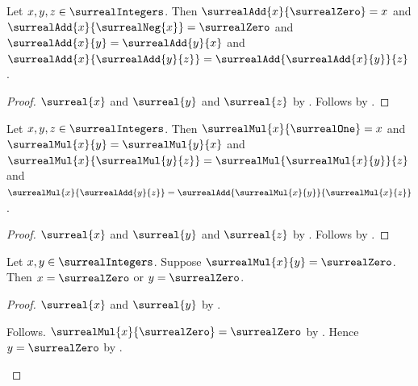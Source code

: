 \begin{theorem}\label{surreal_integer_additive_laws}
    Let $x,y,z\in\surrealIntegers$.
    Then
        $\surrealAdd{x}{\surrealZero}=x$ and
        $\surrealAdd{x}{\surrealNeg{x}}=\surrealZero$ and
        $\surrealAdd{x}{y}=\surrealAdd{y}{x}$ and
        $\surrealAdd{x}{\surrealAdd{y}{z}}
            =\surrealAdd{\surrealAdd{x}{y}}{z}$.
\end{theorem}
\begin{proof}
    $\surreal{x}$ and $\surreal{y}$ and $\surreal{z}$
        by .
    Follows by
        .
\end{proof}

\begin{theorem}\label{surreal_integer_multiplicative_laws}
    Let $x,y,z\in\surrealIntegers$.
    Then
        $\surrealMul{x}{\surrealOne}=x$ and
        $\surrealMul{x}{y}=\surrealMul{y}{x}$ and
        $\surrealMul{x}{\surrealMul{y}{z}}
            =\surrealMul{\surrealMul{x}{y}}{z}$ and
        $\surrealMul{x}{\surrealAdd{y}{z}}
            =\surrealAdd{\surrealMul{x}{y}}{\surrealMul{x}{z}}$.
\end{theorem}
\begin{proof}
    $\surreal{x}$ and $\surreal{y}$ and $\surreal{z}$
        by .
    Follows by
        .
\end{proof}

\begin{theorem}\label{surreal_integer_no_zero_divisors}
    Let $x,y\in\surrealIntegers$.
    Suppose $\surrealMul{x}{y}=\surrealZero$.
    Then $x=\surrealZero$ or $y=\surrealZero$.
\end{theorem}
\begin{proof}
    $\surreal{x}$ and $\surreal{y}$
        by .
    \begin{byCase}
            Follows.
            $\surrealMul{x}{\surrealZero}=\surrealZero$
                by .
            Hence $y=\surrealZero$
                by .
    \end{byCase}
\end{proof}

